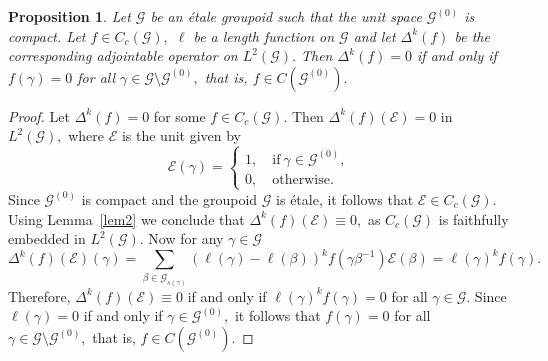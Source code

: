 \documentclass[a4paper,11pt,reqno]{amsart}
\theoremstyle{plain}
\newtheorem{prop}[thm]{Proposition}
\theoremstyle{named}
\numberwithin{equation}{section}
\newcommand{\Bea}{\begin{eqnarray*}}
\newcommand{\Eea}{\end{eqnarray*}}
\begin{document}
			\begin{prop}\label{prop22}
				Let $\mathcal G$ be an étale groupoid such that the unit space $\mathcal G^{(0)}$ is compact. Let $f \in C_c (\mathcal G),$ $\ell$ be a length function on $\mathcal G$ and let $\Delta^k (f)$ be the corresponding adjointable operator on $L^2 (\mathcal G).$ Then $\Delta^k (f) = 0$ if and only if $f (\gamma) = 0$ for all $\gamma \in \mathcal G \setminus \mathcal G^{(0)},$ that is, $f \in C \left (\mathcal G^{(0)} \right ).$    
			\end{prop}
			
			\begin{proof}
				Let $\Delta^k (f) = 0$ for some $f \in C_c (\mathcal G).$ Then $\Delta^k (f) (\mathcal E) = 0$ in $L^2 (\mathcal G),$ where $\mathcal E$ is the unit given by $$\mathcal E (\gamma) = \begin{cases} 1, \quad \text {if}\ \gamma \in \mathcal G^{(0)}, \\ 0, \quad \text {otherwise}. \end{cases}$$ 
				Since $\mathcal G^{(0)}$ is compact and the groupoid \(\mathcal{G}\) is {\'e}tale, it follows that $\mathcal E \in C_c (\mathcal G)$. Using Lemma~\ref{lem2} we conclude that $\Delta^k (f) (\mathcal E) \equiv 0,$ as $C_c (\mathcal G)$ is faithfully embedded in $L^2 (\mathcal G).$ Now for any $\gamma \in \mathcal G$ 
				\[
				\Delta^k (f) (\mathcal E) (\gamma)  =  \sum\limits_{\beta \in \mathcal G_{s(\gamma)}} \left (\ell (\gamma) - \ell (\beta) \right )^k f \left (\gamma \beta^{-1} \right ) \mathcal E (\beta)  =  \ell (\gamma)^k f (\gamma).
				\]
			Therefore, $\Delta^k (f) (\mathcal E) \equiv 0$ if and only if $\ell (\gamma)^k f(\gamma) = 0$ for all $\gamma \in \mathcal G.$ Since $\ell (\gamma) = 0$ if and only if $\gamma \in \mathcal G^{(0)},$ it follows that $f(\gamma) = 0$ for all $\gamma \in \mathcal G \setminus \mathcal G^{(0)},$ that is, $f \in C \left (\mathcal G^{(0)} \right ).$
				
			
				

\end{proof}
\end{document}
